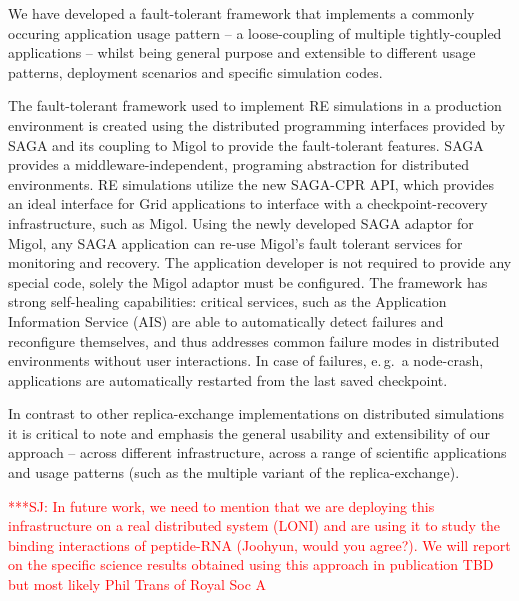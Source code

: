 \documentclass[times, 10pt,twocolumn]{article}
\newcommand{\jhanote}[1]{ {\textcolor{red} { ***SJ: #1 }}}
\newcommand{\jhanote}[1]{}
\begin{document}

We have developed a fault-tolerant framework that implements a
commonly occuring application usage pattern -- a loose-coupling of
multiple tightly-coupled applications -- whilst being general purpose
and extensible to different usage patterns, deployment scenarios and
specific simulation codes.

The fault-tolerant framework used to implement RE simulations in a
production environment is created using the distributed programming
interfaces provided by SAGA and its coupling to Migol to provide the
fault-tolerant features.  SAGA provides a middleware-independent,
programing abstraction for distributed environments. RE simulations
utilize the new SAGA-CPR API, which provides an ideal interface for
Grid applications to interface with a checkpoint-recovery
infrastructure, such as Migol. Using the newly developed SAGA adaptor
for Migol, any SAGA application can re-use Migol's fault tolerant
services for monitoring and recovery.  The application developer is
not required to provide any special code, solely the Migol adaptor
must be configured.  The framework has strong self-healing
capabilities: critical services, such as the Application Information
Service (AIS) are able to automatically detect failures and
reconfigure themselves, and thus addresses common failure modes in
distributed environments without user interactions.
In case of failures, e.\,g.\ a node-crash, applications are
automatically restarted from the last saved
checkpoint. %

In contrast to other replica-exchange implementations on distributed
simulations it is critical to note and emphasis the general usability
and extensibility of our approach -- across different infrastructure,
across a range of scientific applications and usage patterns (such as
the multiple variant of the replica-exchange).

\jhanote{In future work, we need to mention that we are deploying this
  infrastructure on a real distributed system (LONI) and are using it
  to study the binding interactions of peptide-RNA (Joohyun, would you
  agree?). We will report on the specific science results obtained
  using this approach in publication TBD but most likely Phil Trans of
  Royal Soc A}
\end{document}

